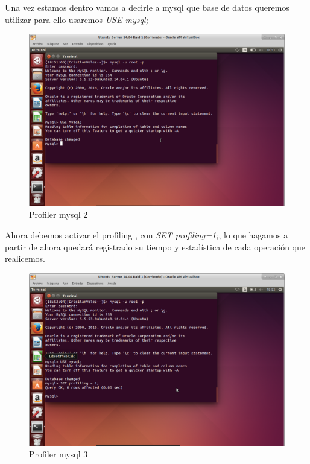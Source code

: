 Una vez estamos dentro vamos a decirle a mysql que base de datos queremos utilizar para ello usaremos \textit{USE mysql;}

\begin{figure}[H] %
	\centering
	\includegraphics[scale=0.35]{pics/profile2.png}  %
	\caption{Profiler mysql 2} \label{fig:p2}
\end{figure}

Ahora debemos activar el profiling , con \textit{SET profiling=1;}, lo que hagamos a partir de ahora quedará registrado su tiempo y estadística de cada operación que realicemos.

\begin{figure}[H] %
	\centering
	\includegraphics[scale=0.35]{pics/profile3.png}  %
	\caption{Profiler mysql 3} \label{fig:p3}
\end{figure}

